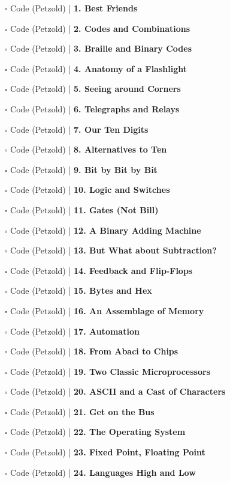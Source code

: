 \documentclass[a4, landscape, 12pt]{article}
\newcommand{\checkbox}{$\square$}%
\begin{document}
\begin{itemize}
\item [\checkbox]  Code (Petzold) | \textbf{ 1. Best Friends
}
\item [\checkbox]  Code (Petzold) | \textbf{ 2. Codes and Combinations
}
\item [\checkbox]  Code (Petzold) | \textbf{ 3. Braille and Binary Codes
}
\item [\checkbox]  Code (Petzold) | \textbf{ 4. Anatomy of a Flashlight
}
\item [\checkbox]  Code (Petzold) | \textbf{ 5. Seeing around Corners
}
\item [\checkbox]  Code (Petzold) | \textbf{ 6. Telegraphs and Relays
}
\item [\checkbox]  Code (Petzold) | \textbf{ 7. Our Ten Digits
}
\item [\checkbox]  Code (Petzold) | \textbf{ 8. Alternatives to Ten
}
\item [\checkbox]  Code (Petzold) | \textbf{ 9. Bit by Bit by Bit
}
\item [\checkbox]  Code (Petzold) | \textbf{ 10. Logic and Switches
}
\item [\checkbox]  Code (Petzold) | \textbf{ 11. Gates (Not Bill)
}
\item [\checkbox]  Code (Petzold) | \textbf{ 12. A Binary Adding Machine
}
\item [\checkbox]  Code (Petzold) | \textbf{ 13. But What about Subtraction?
}
\item [\checkbox]  Code (Petzold) | \textbf{ 14. Feedback and Flip-Flops
}
\item [\checkbox]  Code (Petzold) | \textbf{ 15. Bytes and Hex
}
\item [\checkbox]  Code (Petzold) | \textbf{ 16. An Assemblage of Memory
}
\item [\checkbox]  Code (Petzold) | \textbf{ 17. Automation
}
\item [\checkbox]  Code (Petzold) | \textbf{ 18. From Abaci to Chips
}
\item [\checkbox]  Code (Petzold) | \textbf{ 19. Two Classic Microprocessors
}
\item [\checkbox]  Code (Petzold) | \textbf{ 20. ASCII and a Cast of Characters
}
\item [\checkbox]  Code (Petzold) | \textbf{ 21. Get on the Bus
}
\item [\checkbox]  Code (Petzold) | \textbf{ 22. The Operating System
}
\item [\checkbox]  Code (Petzold) | \textbf{ 23. Fixed Point, Floating Point
}
\item [\checkbox]  Code (Petzold) | \textbf{ 24. Languages High and Low
}
\end{itemize}
\end{document}
